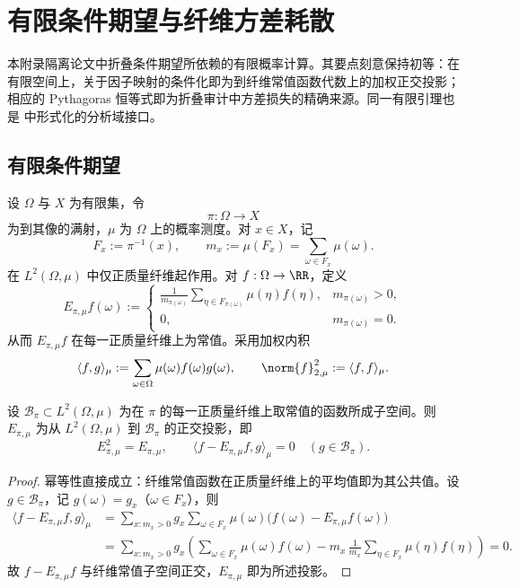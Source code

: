 \documentclass[../../main.tex]{subfiles}
\begin{document}
\section{有限条件期望与纤维方差耗散}\label{app:finite-conditional-expectation}

本附录隔离论文中折叠条件期望所依赖的有限概率计算。其要点刻意保持初等：在有限空间上，关于因子映射的条件化即为到纤维常值函数代数上的加权正交投影；相应的 Pythagoras 恒等式即为折叠审计中方差损失的精确来源。同一有限引理也是
\texttt{}
中形式化的分析域接口。

\subsection{有限条件期望}

设 \(\Omega\) 与 \(X\) 为有限集，令
\[
    \pi:\Omega\longrightarrow X
\]
为到其像的满射，\(\mu\) 为 \(\Omega\) 上的概率测度。对 \(x\in X\)，记
\[
    F_x:=\pi^{-1}(x),
    \qquad
    m_x:=\mu(F_x)=\sum_{\omega\in F_x}\mu(\omega).
\]
在 \(L^2(\Omega,\mu)\) 中仅正质量纤维起作用。对 \(f:\Omega\to\RR\)，定义
\[
    E_{\pi,\mu}f(\omega)
    :=
    \begin{cases}
    \displaystyle
    \frac{1}{m_{\pi(\omega)}}\sum_{\eta\in F_{\pi(\omega)}}\mu(\eta)f(\eta),
    &m_{\pi(\omega)}>0,\\[1.2em]
    0,&m_{\pi(\omega)}=0.
    \end{cases}
\]
从而 \(E_{\pi,\mu}f\) 在每一正质量纤维上为常值。采用加权内积
\[
    \langle f,g\rangle_\mu:=\sum_{\omega\in\Omega}\mu(\omega)f(\omega)g(\omega),
    \qquad
    \norm{f}_{2,\mu}^2:=\langle f,f\rangle_\mu .
\]

\begin{lemma}[纤维正交投影]\label{lem:finite-condexp-orthogonal-projection}
设 \(\mathcal B_\pi\subset L^2(\Omega,\mu)\) 为在 \(\pi\) 的每一正质量纤维上取常值的函数所成子空间。则 \(E_{\pi,\mu}\) 为从 \(L^2(\Omega,\mu)\) 到 \(\mathcal B_\pi\) 的正交投影，即
\[
    E_{\pi,\mu}^2=E_{\pi,\mu},
    \qquad
    \langle f-E_{\pi,\mu}f,g\rangle_\mu=0
    \quad (g\in\mathcal B_\pi).
\]
\end{lemma}

\begin{proof}
幂等性直接成立：纤维常值函数在正质量纤维上的平均值即为其公共值。设 \(g\in\mathcal B_\pi\)，记 \(g(\omega)=g_x\)（\(\omega\in F_x\)），则
\[
\begin{aligned}
    \langle f-E_{\pi,\mu}f,g\rangle_\mu
    &=
    \sum_{x:m_x>0}
    g_x
    \sum_{\omega\in F_x}
    \mu(\omega)\bigl(f(\omega)-E_{\pi,\mu}f(\omega)\bigr)\\
    &=
    \sum_{x:m_x>0}
    g_x
    \left(
    \sum_{\omega\in F_x}\mu(\omega)f(\omega)
    -
    m_x\,\frac{1}{m_x}\sum_{\eta\in F_x}\mu(\eta)f(\eta)
    \right)
    =0 .
\end{aligned}
\]
故 \(f-E_{\pi,\mu}f\) 与纤维常值子空间正交，\(E_{\pi,\mu}\) 即为所述投影。
\end{proof}
\end{document}
